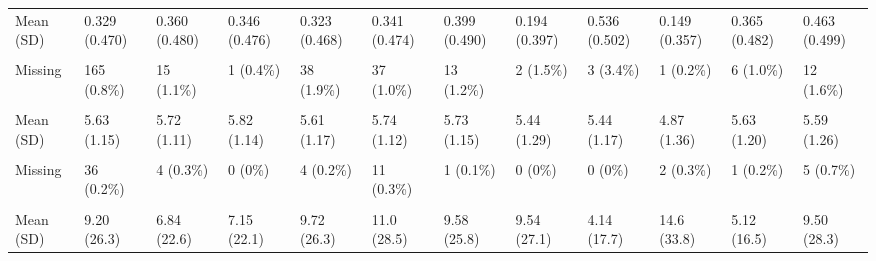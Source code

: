 \documentclass[
  single column]{article}
\begin{document}
\begin{landscape}
\begin{longtable}[t]{llllllllllll}
Mean (SD) & 0.329 (0.470) & 0.360 (0.480) & 0.346 (0.476) & 0.323 (0.468) & 0.341 (0.474) & 0.399 (0.490) & 0.194 (0.397) & 0.536 (0.502) & 0.149 (0.357) & 0.365 (0.482) & 0.463 (0.499)\\
\cellcolor{gray!10}{Median [Min, Max]} & \cellcolor{gray!10}{0 [0, 1.00]} & \cellcolor{gray!10}{0 [0, 1.00]} & \cellcolor{gray!10}{0 [0, 1.00]} & \cellcolor{gray!10}{0 [0, 1.00]} & \cellcolor{gray!10}{0 [0, 1.00]} & \cellcolor{gray!10}{0 [0, 1.00]} & \cellcolor{gray!10}{0 [0, 1.00]} & \cellcolor{gray!10}{1.00 [0, 1.00]} & \cellcolor{gray!10}{0 [0, 1.00]} & \cellcolor{gray!10}{0 [0, 1.00]} & \cellcolor{gray!10}{0 [0, 1.00]}\\
\addlinespace
Missing & 165 (0.8\%) & 15 (1.1\%) & 1 (0.4\%) & 38 (1.9\%) & 37 (1.0\%) & 13 (1.2\%) & 2 (1.5\%) & 3 (3.4\%) & 1 (0.2\%) & 6 (1.0\%) & 12 (1.6\%)\\
\cellcolor{gray!10}{honesty\_humility} & \cellcolor{gray!10}{} & \cellcolor{gray!10}{} & \cellcolor{gray!10}{} & \cellcolor{gray!10}{} & \cellcolor{gray!10}{} & \cellcolor{gray!10}{} & \cellcolor{gray!10}{} & \cellcolor{gray!10}{} & \cellcolor{gray!10}{} & \cellcolor{gray!10}{} & \cellcolor{gray!10}{}\\
Mean (SD) & 5.63 (1.15) & 5.72 (1.11) & 5.82 (1.14) & 5.61 (1.17) & 5.74 (1.12) & 5.73 (1.15) & 5.44 (1.29) & 5.44 (1.17) & 4.87 (1.36) & 5.63 (1.20) & 5.59 (1.26)\\
\cellcolor{gray!10}{Median [Min, Max]} & \cellcolor{gray!10}{5.75 [1.00, 7.00]} & \cellcolor{gray!10}{6.00 [1.25, 7.00]} & \cellcolor{gray!10}{6.00 [2.00, 7.00]} & \cellcolor{gray!10}{5.75 [1.00, 7.00]} & \cellcolor{gray!10}{6.00 [1.00, 7.00]} & \cellcolor{gray!10}{6.00 [1.00, 7.00]} & \cellcolor{gray!10}{5.50 [1.50, 7.00]} & \cellcolor{gray!10}{5.67 [2.00, 7.00]} & \cellcolor{gray!10}{5.00 [1.00, 7.00]} & \cellcolor{gray!10}{6.00 [1.00, 7.00]} & \cellcolor{gray!10}{5.75 [1.00, 7.00]}\\
Missing & 36 (0.2\%) & 4 (0.3\%) & 0 (0\%) & 4 (0.2\%) & 11 (0.3\%) & 1 (0.1\%) & 0 (0\%) & 0 (0\%) & 2 (0.3\%) & 1 (0.2\%) & 5 (0.7\%)\\
\addlinespace
\cellcolor{gray!10}{hours\_children} & \cellcolor{gray!10}{} & \cellcolor{gray!10}{} & \cellcolor{gray!10}{} & \cellcolor{gray!10}{} & \cellcolor{gray!10}{} & \cellcolor{gray!10}{} & \cellcolor{gray!10}{} & \cellcolor{gray!10}{} & \cellcolor{gray!10}{} & \cellcolor{gray!10}{} & \cellcolor{gray!10}{}\\
Mean (SD) & 9.20 (26.3) & 6.84 (22.6) & 7.15 (22.1) & 9.72 (26.3) & 11.0 (28.5) & 9.58 (25.8) & 9.54 (27.1) & 4.14 (17.7) & 14.6 (33.8) & 5.12 (16.5) & 9.50 (28.3)\\

\end{longtable}
\end{landscape}
\end{document}
